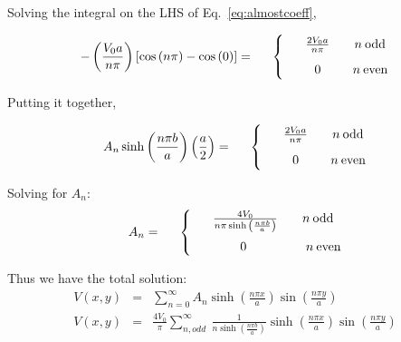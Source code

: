 \documentclass[12pt]{article}
\begin{document}
\begin{flushleft}
Solving the integral on the LHS of Eq.~\ref{eq:almostcoeff},

\begin{equation*}
 - \left( \frac{V_{0}a}{n\pi} \right)  \left[ \cos{(n\pi)} - \cos{(0)} \right] =  \hspace{.2in}
 \begin{cases}
 & \hspace{.1in} \frac{2V_{0}a}{n\pi}  \hspace{.27in}  n \: \text{odd}\\[6pt]
 & \hspace{.1in} \hspace{.1in} 0  \hspace{.35in}  n \: \text{even}
\end{cases}
 \end{equation*}

Putting it together,

\begin{equation*}
 A_{n}\sinh{\left(\frac{n\pi b}{a}\right)} \left( \frac{a}{2}\right) =  \hspace{.2in}
 \begin{cases}
 & \hspace{.1in} \frac{2V_{0}a}{n\pi}  \hspace{.27in}  n \: \text{odd}\\[6pt]
 & \hspace{.1in} \hspace{.1in} 0  \hspace{.35in}  n \: \text{even}
\end{cases}
 \end{equation*}
 
 Solving for $A_{n}$:
\begin{equation*}
 A_{n}  =  \hspace{.2in}
 \begin{cases}
 & \hspace{.1in} \frac{4V_{0}}{n\pi \sinh{\left(\frac{n\pi b}{a}\right)}}  \hspace{.27in}  n \: \text{odd}\\[8pt]
 & \hspace{.1in} \hspace{.3in} 0  \hspace{.65in}  n \: \text{even}
\end{cases}
 \end{equation*}

\vspace{.1in}
Thus we have the total solution:
\begin{eqnarray*}
V(x,y) & = & \sum_{n=0}^{\infty} A_{n}\sinh{ \left(\frac{n\pi x}{a}\right) }\sin{ \left(\frac{n\pi y}{a}\right) } \\[6pt]
V(x,y) & = & \frac{4V_{0}}{\pi} \sum_{n, odd}^{\infty} \: \frac{1}{n\sinh{\left(\frac{n\pi b}{a}\right)}} \sinh{ \left(\frac{n\pi x}{a}\right) }\sin{ \left(\frac{n\pi y}{a}\right) } 
\end{eqnarray*}


\end{flushleft}
\end{document}
